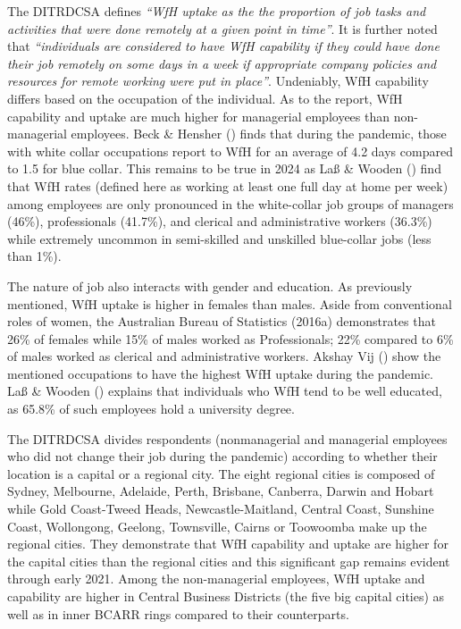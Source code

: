 \documentclass[
  a4paper,
]{article}
\numberwithin{equation}{section}
\numberwithin{figure}{section}
\numberwithin{table}{section}
\begin{document}
The DITRDCSA defines \emph{``WfH uptake as the the proportion of job tasks and activities that were done remotely at a given point in time''}. It is further noted that \emph{``individuals are considered to have WfH capability if they could have done their job remotely on some days in a week if appropriate company policies and resources for remote working were put in place''}. Undeniably, WfH capability differs based on the occupation of the individual. As to the report, WfH capability and uptake are much higher for managerial employees than non-managerial employees. Beck \& Hensher () finds that during the pandemic, those with white collar occupations report to WfH for an average of 4.2 days compared to 1.5 for blue collar. This remains to be true in 2024 as Laß \& Wooden () find that WfH rates (defined here as working at least one full day at home per week) among employees are only pronounced in the white-collar job groups of managers (46\%), professionals (41.7\%), and clerical and administrative workers (36.3\%) while extremely uncommon in semi-skilled and unskilled blue-collar jobs (less than 1\%).

The nature of job also interacts with gender and education. As previously mentioned, WfH uptake is higher in females than males. Aside from conventional roles of women, the Australian Bureau of Statistics (2016a) demonstrates that 26\% of females while 15\% of males worked as Professionals; 22\% compared to 6\% of males worked as clerical and administrative workers. Akshay Vij () show the mentioned occupations to have the highest WfH uptake during the pandemic. Laß \& Wooden () explains that individuals who WfH tend to be well educated, as 65.8\% of such employees hold a university degree.

The DITRDCSA divides respondents (nonmanagerial and managerial employees who did not change their job during the pandemic) according to whether their location is a capital or a regional city. The eight regional cities is composed of Sydney, Melbourne, Adelaide, Perth, Brisbane, Canberra, Darwin and Hobart while Gold Coast-Tweed Heads, Newcastle-Maitland, Central Coast, Sunshine Coast, Wollongong, Geelong, Townsville, Cairns or Toowoomba make up the regional cities. They demonstrate that WfH capability and uptake are higher for the capital cities than the regional cities and this significant gap remains evident through early 2021. Among the non-managerial employees, WfH uptake and capability are higher in Central Business Districts (the five big capital cities) as well as in inner BCARR rings compared to their counterparts.
\end{document}
